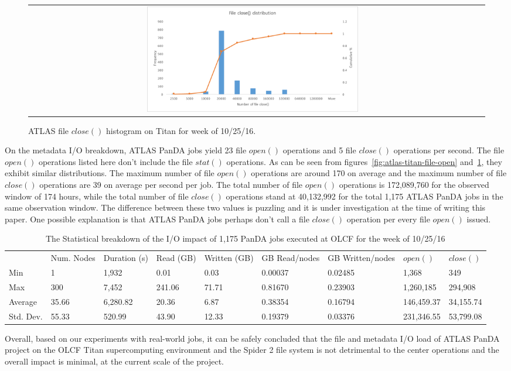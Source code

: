 \begin{figure}[!htb]
    \centering
    \begin{tabular}{cc}
        {\includegraphics[width=0.48\textwidth]{figures/panda_file_close_hist.pdf}}\\
    \end{tabular}
    \caption{ATLAS file $close()$ histogram on Titan for week of 10/25/16.}
\label{fig:atlas-titan-file-close}
\end{figure}

On the metadata I/O breakdown, ATLAS PanDA jobs yield 23 file $open()$
operations and 5 file $close()$ operations per second. The file $open()$
operations listed here don't include the file $stat()$ operations. As can be
seen from figures~\ref{fig:atlas-titan-file-open}
and~\ref{fig:atlas-titan-file-close}, they exhibit similar distributions. The
maximum number of file $open()$ operations are around 170 on average and the
maximum number of file $close()$ operations are 39 on average per second per
job. The total number of file $open()$ operations is 172,089,760 for the
observed window of 174 hours, while the total number of file $close()$
operations stand at 40,132,992 for the total 1,175 ATLAS PanDA jobs in the same
observation window. The difference between these two values is puzzling and it
is under investigation at the time of writing this paper. One possible
explanation is that ATLAS PanDA jobs perhaps don't call a file $close()$
operation per every file $open()$ issued.

\begin{table}[t]
\centering
\begin{tabular}{lllllllll}
 & Num. Nodes & Duration (s) & Read (GB) & Written (GB) & GB Read/nodes & GB Written/nodes & $open()$ & $close()$ \\
Min & 1 & 1,932 & 0.01 & 0.03 & 0.00037 & 0.02485 & 1,368 & 349 \\
Max & 300 & 7,452 & 241.06 & 71.71 & 0.81670 & 0.23903 & 1,260,185 & 294,908 \\
Average & 35.66 & 6,280.82 & 20.36 & 6.87 & 0.38354 & 0.16794 & 146,459.37 & 34,155.74 \\
Std. Dev. & 55.33 & 520.99 & 43.90 & 12.33 & 0.19379 & 0.03376 & 231,346.55 & 53,799.08
\end{tabular}
\caption{The Statistical breakdown of the I/O impact of 1,175 PanDA jobs executed at OLCF for the week of 10/25/16}
\label{panda-olcf-stats}
\end{table}

Overall, based on our experiments with real-world jobs, it can be safely
concluded that the file and metadata I/O load of ATLAS PanDA project on the OLCF
Titan supercomputing environment and the Spider 2 file system is not detrimental
to the center operations and the overall impact is minimal, at the current scale
of the project.
